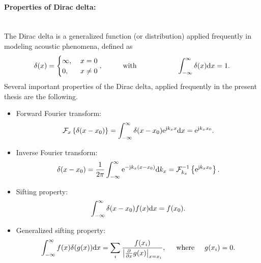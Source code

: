 \paragraph{Properties of Dirac delta:}\mbox{} \\
The Dirac delta is a generalized function (or distribution) applied frequently in modeling acoustic phenomena, defined as
\begin{equation}
\delta(x) = 
\begin{cases}
\infty, & \hspace{1mm} x = 0\\
0, & \hspace{1mm}  x \neq 0
\end{cases},
\hspace{1cm}
\text{with}
\hspace{2cm}
\int_{-\infty}^{\infty} \delta(x) \mathrm{d} x = 1.
\end{equation}
Several important properties of the Dirac delta, applied frequently in the present thesis are the following.
\begin{itemize}
\item Forward Fourier transform:
\begin{equation}
\mathcal{F}_x \left\{\delta(x-x_0)\right\} = \int_{-\infty}^{\infty} \delta(x-x_0) \mathrm{e}^{\mathrm{j} k_x x} \mathrm{d} x =   \mathrm{e}^{\mathrm{j} k_x x_0}.
\end{equation}
\item Inverse Fourier transform:
\begin{equation}
\delta(x-x_0) = \frac{1}{2\pi} \int_{-\infty}^{\infty} \mathrm{e}^{-\mathrm{j} k_x (x-x_0)} \mathrm{d} k_x =  \mathcal{F}^{-1}_{k_x} \left\{ \mathrm{e}^{\mathrm{j} k_x x_0} \right\}.
\end{equation}
\item Sifting property:
\begin{equation}
\int_{-\infty}^{\infty} \delta(x-x_0) f(x) \mathrm{d} x = f(x_0).
\end{equation}
\item Generalized sifting property:
\begin{equation}
\int_{-\infty}^{\infty} f(x) \delta(g(x)) \mathrm{d} x = \sum_{i} \frac{f(x_i)}{\left| \frac{\partial}{\partial x} g(x) \right|_{x = x_i}}, \hspace{5mm} \text{where} \hspace{5mm} g(x_i) = 0.
\end{equation} 
\end{itemize}